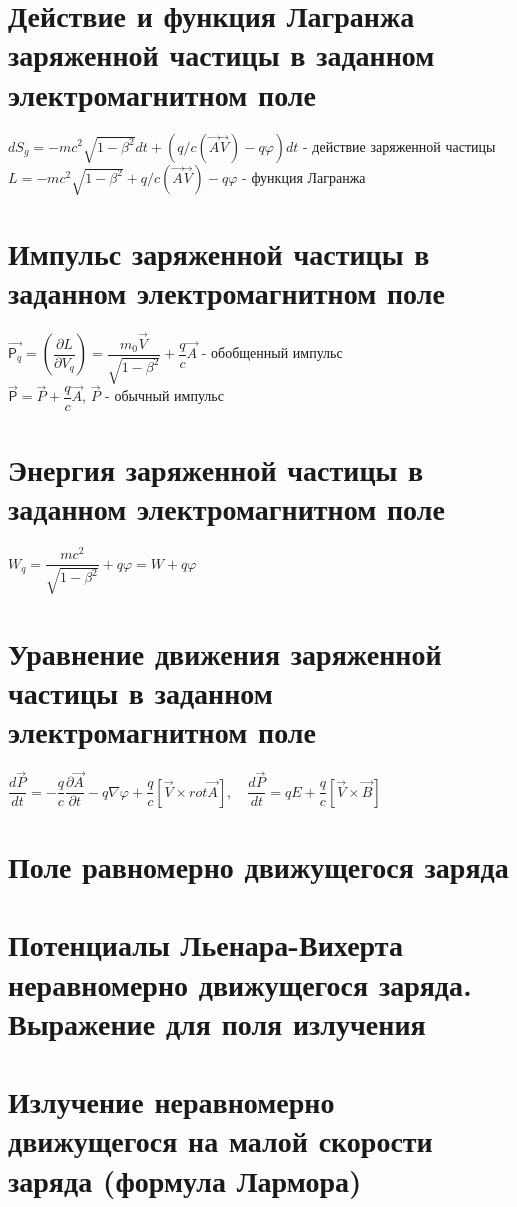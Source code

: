 \begin{multicols*}{2}
	
		\section{Действие и функция Лагранжа заряженной частицы в заданном электромагнитном поле}
		$dS_g = -mc^2\sqrt{1-\beta^2} dt + (q/c(\vec{A}\vec{V}) - q\varphi)dt$ - действие заряженной частицы\\
		$L = -mc^2\sqrt{1-\beta^2} + q/c(\vec{A}\vec{V}) - q\varphi$ - функция Лагранжа
		
		\section{Импульс заряженной частицы в заданном электромагнитном поле}
		$\vec{\mathsf{P}_q} = (\dfrac{\partial L}{\partial V_q}) = \dfrac{m_0\vec{V}}{\sqrt{1-\beta^2}} + \dfrac{q}{c}\vec{A}$ - обобщенный импульс\\
		$\vec{\mathsf{P}} = \vec{P} + \dfrac{q}{c}\vec{A}$, \quad $\vec{P}$ - обычный импульс
		
		\section{Энергия заряженной частицы в заданном электромагнитном поле}
		$W_q = \dfrac{mc^2}{\sqrt{1-\beta^2}} + q\varphi = W + q\varphi$
		
		\section{Уравнение движения заряженной частицы в заданном электромагнитном поле}
		$\dfrac{d\vec{P}}{dt} = -\dfrac{q}{c}\dfrac{\partial \vec{A}}{\partial t} - q\nabla \varphi + \dfrac{q}{c}\left[\vec{V}\times rot\vec{A}\right], \quad \dfrac{d\vec{P}}{dt} = qE + \dfrac{q}{c}\left[\vec{V}\times \vec{B}\right] $
		
		\section{Поле равномерно движущегося заряда}
		
		\section{Потенциалы Льенара-Вихерта неравномерно движущегося заряда. Выражение для поля излучения}
		
		\section{Излучение неравномерно движущегося на малой скорости заряда (формула Лармора)}
		

\end{multicols*}
